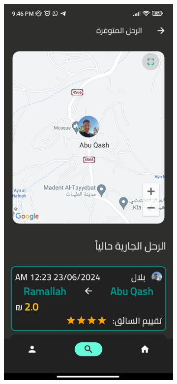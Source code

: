 \documentclass[a4paper, 12pt]{report} %
\begin{document}
\begin{figure}[H]
                \begin{subfigure}{0.31\textwidth}
                    \includegraphics[width=\linewidth]{Images/trip_search_4.jpg}

\end{subfigure}
\end{figure}
\end{document}

